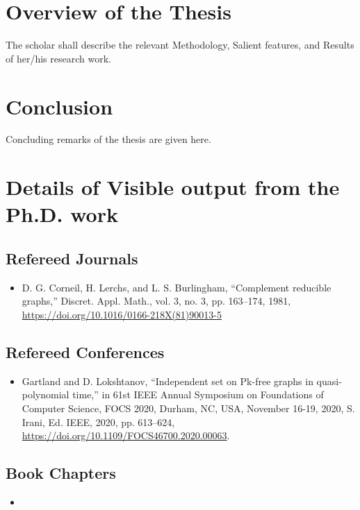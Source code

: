 \documentclass[12pt,A4paper]{article}
\begin{document}
\section{Overview of the Thesis}
The scholar shall describe the relevant Methodology, Salient features, and Results of her/his research work.



\section{Conclusion}

Concluding remarks of the thesis are given here.
\newpage

\section*{Details of Visible output from the Ph.D. work}
\subsection*{Refereed Journals}
    \begin{itemize}
        \item D. G. Corneil, H. Lerchs, and L. S. Burlingham, “Complement reducible graphs,” Discret. Appl. Math., vol. 3, no. 3, pp. 163–174, 1981, \href{https://doi.org/10.1016/0166-218X(81)90013-5}{https://doi.org/10.1016/0166-218X(81)90013-5}  
    \end{itemize}

\subsection*{Refereed Conferences}

    \begin{itemize}     
        \item  Gartland and D. Lokshtanov, “Independent set on Pk-free graphs in quasi-polynomial time,” in 61st IEEE Annual Symposium on Foundations of Computer Science, FOCS 2020, Durham, NC, USA, November 16-19, 2020, S. Irani, Ed. IEEE, 2020, pp. 613–624, \href{https://doi.org/10.1109/FOCS46700.2020.00063}{https://doi.org/10.1109/FOCS46700.2020.00063}.
    \end{itemize}
\subsection*{Book Chapters}
\begin{itemize}     
        \item
    \end{itemize}
\end{document}
